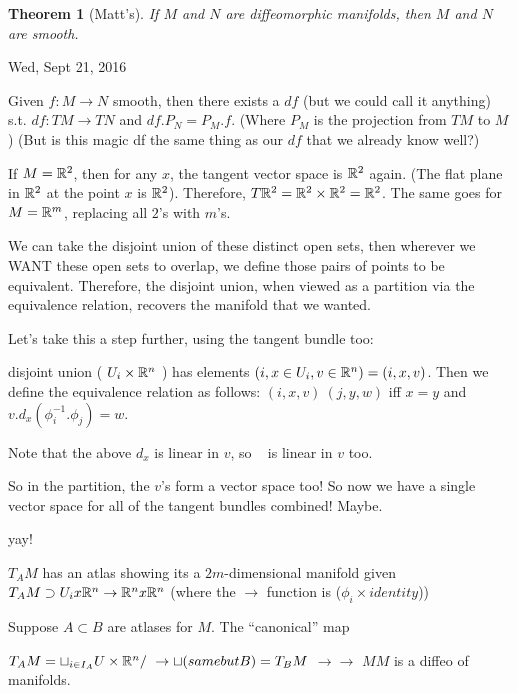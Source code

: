 \documentclass[11pt,leqno,oneside]{amsart}
\theoremstyle{mystyle} \newtheorem{thrm}[thm]{Theorem}
\theoremstyle{mystyle} \newtheorem{defi}[thm]{Definition}
\begin{document}
\begin{thrm}[Matt's]
	If $M$ and $N$ are diffeomorphic manifolds, then $M$ and $N$ are smooth.
\end{thrm}


Wed, Sept 21, 2016

Given $f:M \to N$ smooth, then there exists a $df$ (but we could call it anything) s.t. $df : TM \to TN$ and $df.P_N = P_M.f$.  (Where $P_M$ is the projection from $TM$ to $M$)  (But is this magic df the same thing as our $df$ that we already know well?)

\begin{example}
	If $M = {\mathbb R}^2$, then for any $x$, the tangent vector space is ${\mathbb R}^2$ again.  (The flat plane in ${\mathbb R}^2$ at the point $x$ is ${\mathbb R}^2$).  Therefore, $T{\mathbb R}^2 = {\mathbb R}^2 \times {\mathbb R}^2 = {\mathbb R}^2$.  The same goes for $M = {\mathbb R}^m$, replacing all $2$'s with $m$'s.
\end{example}

We can take the disjoint union of these distinct open sets, then wherever we WANT these open sets to overlap, we define those pairs of points to be equivalent.  Therefore, the disjoint union, when viewed as a partition via the equivalence relation, recovers the manifold that we wanted.

Let's take this a step further, using the tangent bundle too:

disjoint union ( $U_i \times {\mathbb R}^n$ ) has elements $(i, x \in U_i, v \in {\mathbb R}^n) = (i, x, v)$.
Then we define the equivalence relation as follows:
$(i, x, v) ~ (j, y, w)$ iff $x=y$ and $v.d_x(\phi_i^{-1}.\phi_j) = w$.

Note that the above $d_x$ is linear in $v$, so ~ is linear in $v$ too.

So in the partition, the $v$'s form a vector space too!  So now we have a single vector space for all of the tangent bundles combined!  Maybe.

yay!

\begin{lem}
	$T_A M$ has an atlas showing its a $2m$-dimensional manifold given
	$T_A M \supset U_i x {\mathbb R}^n \to {\mathbb R}^n x {\mathbb R}^n$ (where the $\to$ function is ($\phi_i \times identity$))
\end{lem}
\begin{cor}
	Suppose $A \subset B$ are atlases for $M$.  The ``canonical'' map

	$T_A M = \sqcup_{i \in I_A} U \times {\mathbb R}^n/~ \to \sqcup (same but B) = T_B M$
				$\to										\to$
				$M 										M$
	is a diffeo of manifolds.
\end{cor}
\end{document}
